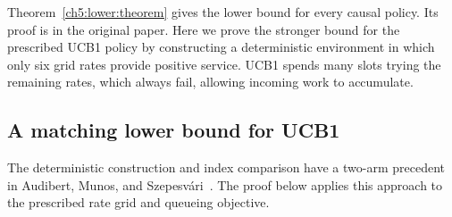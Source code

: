 Theorem~\ref{ch5:lower:theorem} gives the lower bound for every causal
policy. Its proof is in the original paper. Here we prove the stronger
bound for the prescribed UCB1 policy by constructing a deterministic
environment in which only six grid rates provide positive service. UCB1
spends many slots trying the remaining rates, which always fail, allowing
incoming work to accumulate.

\subsection{A matching lower bound for UCB1}
\label{ch5:lower:ucb-log-proof}

The deterministic construction and index comparison have a two-arm
precedent in Audibert, Munos, and Szepesv{\'a}ri~\cite[Appendix~A.2,
Proposition~1 and Lemma~4]{audibert2009exploration}.
The proof below applies this approach to the prescribed rate grid
and queueing objective.

